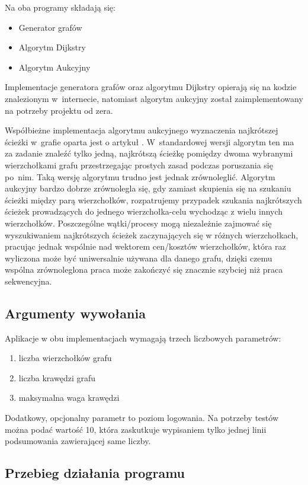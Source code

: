 \documentclass {report}
\begin{document}
Na oba programy składają się:
\begin{itemize}
    \item Generator grafów
    \item Algorytm Dijkstry
    \item Algorytm Aukcyjny
\end{itemize}

Implementacje generatora grafów oraz algorytmu Dijkstry opierają się na kodzie znalezionym w~internecie, natomiast algorytm aukcyjny został zaimplementowany na potrzeby projektu od zera.

Współbieżne implementacja algorytmu aukcyjnego wyznaczenia najkrótszej ścieżki w~grafie oparta jest o artykuł \cite{Bertsekas1991}. W~standardowej wersji algorytm ten ma za zadanie znaleźć tylko jedną, najkrótszą ścieżkę pomiędzy dwoma wybranymi wierzchołkami grafu przestrzegając prostych zasad podczas poruszania się po~nim. Taką wersję algorytmu trudno jest jednak zrównoleglić. Algorytm aukcyjny bardzo dobrze zrównolegla się, gdy zamiast skupienia się na szukaniu ścieżki między parą wierzchołków, rozpatrujemy przypadek szukania najkrótszych ścieżek prowadzących do jednego wierzchołka-celu wychodząc z wielu innych wierzchołków. Poszczególne wątki/procesy mogą niezależnie zajmować się wyszukiwaniem najkrótszych ścieżek zaczynających się w różnych wierzchołkach, pracując jednak wspólnie nad wektorem cen/kosztów wierzchołków, która raz wyliczona może być uniwersalnie używana dla danego grafu, dzięki czemu wspólna zrównoleglona praca może zakończyć się znacznie szybciej niż praca sekwencyjna.

\subsection{Argumenty wywołania}

Aplikacje w obu implementacjach wymagają trzech liczbowych parametrów:

\begin{enumerate}
 \item liczba wierzchołków grafu
 \item liczba krawędzi grafu
 \item maksymalna waga krawędzi
\end{enumerate}

Dodatkowy, opcjonalny parametr to poziom logowania. Na potrzeby testów można podać wartość 10, która zaskutkuje wypisaniem tylko jednej linii podsumowania zawierającej same liczby.

\subsection{Przebieg działania programu}
\end{document}

